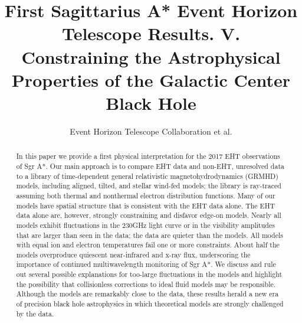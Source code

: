\documentclass[twocolumn,twocolappendix,tighten,dvipsnames,linenumbers]{aastex63}
\begin{document}
\title{First Sagittarius A* Event Horizon Telescope Results. V.\\
  Constraining the Astrophysical Properties of the Galactic Center Black Hole}

%
\author{Event Horizon Telescope Collaboration et al.}


\received{\today}
\revised{\today}

\begin{abstract}

In this paper we provide a first physical interpretation for the 2017 EHT observations of Sgr A*.  Our main approach is to compare EHT data and non-EHT, unresolved data to a library of time-dependent general relativistic magnetohydrodynamics (GRMHD) models, including aligned, tilted, and stellar wind-fed models; the library is ray-traced assuming both thermal and nonthermal electron distribution functions.  Many of our models have  spatial structure that is consistent with the EHT data alone.  The EHT data alone are, however, strongly constraining and disfavor edge-on models.  Nearly all models exhibit fluctuations in the $230$GHz light curve or in the visibility amplitudes that are larger than seen in the data; the data are quieter than the models.  All models with equal ion and electron temperatures fail one or more constraints.  About half the  models overproduce quiescent near-infrared and x-ray flux, underscoring the importance of continued multiwavelength monitoring of Sgr A*.  We discuss and rule out several possible explanations for too-large fluctuations in the models and highlight the possibility that collisionless corrections to ideal fluid models may be responsible.  Although the models are remarkably close to the data, these results herald a new era of precision black hole astrophysics in which theoretical models are strongly challenged by the data.   


  \color{BrickRed}




\end{abstract}
\end{document}
